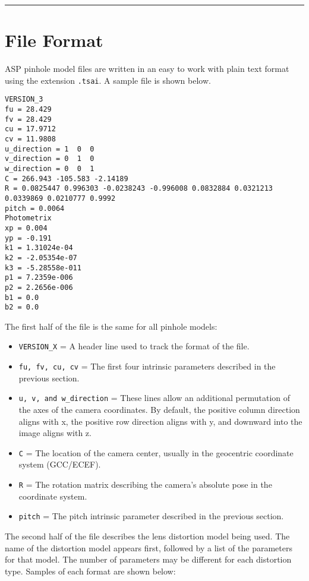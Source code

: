 \hrule
\section{File Format}
\label{file_format}
\bigskip

ASP pinhole model files are written in an easy to work with plain text format 
using the extension \texttt{.tsai}.
A sample file is shown below. 

\begin{verbatim}
VERSION_3
fu = 28.429
fv = 28.429
cu = 17.9712
cv = 11.9808
u_direction = 1  0  0
v_direction = 0  1  0
w_direction = 0  0  1
C = 266.943 -105.583 -2.14189
R = 0.0825447 0.996303 -0.0238243 -0.996008 0.0832884 0.0321213 0.0339869 0.0210777 0.9992
pitch = 0.0064
Photometrix
xp = 0.004
yp = -0.191
k1 = 1.31024e-04
k2 = -2.05354e-07
k3 = -5.28558e-011
p1 = 7.2359e-006
p2 = 2.2656e-006
b1 = 0.0
b2 = 0.0
\end{verbatim}

The first half of the file is the same for all pinhole models:

\begin{itemize}{}
\item  \texttt{VERSION\_X} = A header line used to track the format of the file.
\item  \texttt{fu, fv, cu, cv} = The first four intrinsic parameters described in the previous section.
\item  \texttt{u, v, and w\_direction} = These lines allow an additional permutation of the 
axes of the camera coordinates.  By default, the positive column direction aligns with x, the
positive row direction aligns with y, and downward into the image aligns with z.
\item  \texttt{C} = The location of the camera center, usually in the geocentric coordinate system (GCC/ECEF).
\item  \texttt{R} = The rotation matrix describing the camera's absolute pose in the coordinate system.
\item  \texttt{pitch} = The pitch intrinsic parameter described in the previous section.
\end{itemize}

The second half of the file describes the lens distortion model being used.  The name of the
distortion model appears first, followed by a list of the parameters for that model.  The number
of parameters may be different for each distortion type.  Samples of each format are shown below:

